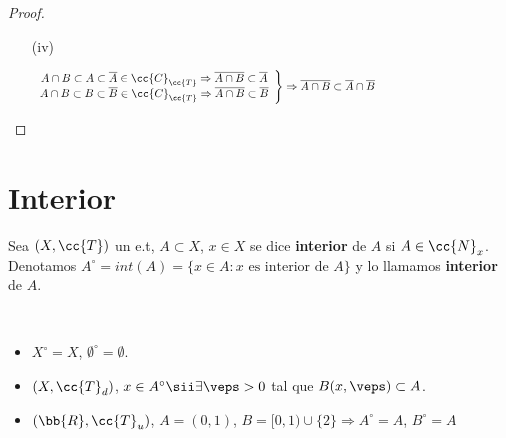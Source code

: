\begin{prop}
\begin{proof}
\begin{enumerate}
\begin{itemize}
            \end{itemize}
            \item[(iv)]\ \\
            \vspace{-2cm}

            \begin{gather*}
                \left.
                \begin{array}{c}
                    A\cap B \subset A \subset \overline{A}\in \cc{C}_{\cc{T}}\Rightarrow \overline{A\cap B}\subset \overline{A} \\
                    A\cap B \subset B \subset \overline{B}\in \cc{C}_{\cc{T}}\Rightarrow \overline{A\cap B}\subset \overline{B}
                \end{array}\right\} \Rightarrow \overline{A\cap B}\subset \overline{A}\cap \overline{B} \hspace*{5cm}
            \end{gather*}
        \end{enumerate}
    \end{proof}
\end{prop}

\section{Interior}

\begin{definicion}
    Sea $(X, \cc{T})$ un e.t, $A\subset X$, $x\in X$ se dice \textbf{interior} de $A$ si $A\in \cc{N}_x$. Denotamos $A^\circ=int(A)=\{x\in A : x \text{ es interior de }A\}$ y lo llamamos \textbf{interior} de $A$.
    \endsquare 
\end{definicion}

\begin{ejemplo}\
    \begin{itemize}
        \item $X^\circ = X$, $\emptyset^\circ = \emptyset$.
        \item $(X, \cc{T}_d)$, $x \in A^\circ \sii \exists \veps >0 $ tal que $B(x, \veps)\subset A$.
        \item $(\bb{R}, \cc{T}_u)$, $A=(0,1)$, $B=[0,1)\cup \{2\} \Rightarrow A^\circ=A$, $B^\circ=A$
    \end{itemize}
\end{ejemplo}

